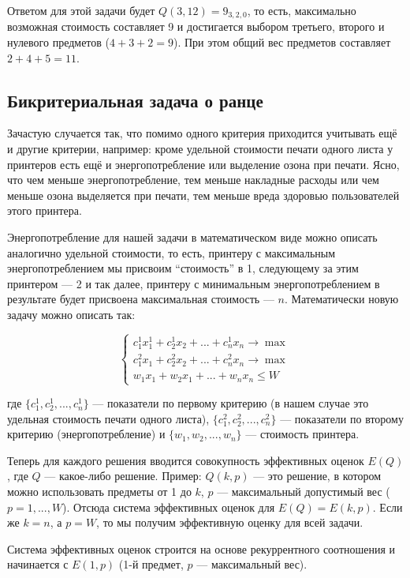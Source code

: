 Ответом для этой задачи будет $Q(3,12) = 9_{3,2,0}$, то есть, максимально возможная стоимость составляет 9 и достигается выбором третьего, второго и нулевого предметов ($4 + 3 + 2 = 9$). При этом общий вес предметов составляет $2 + 4 + 5 = 11$.

\subsection*{Бикритериальная задача о ранце}

Зачастую случается так, что помимо одного критерия приходится учитывать ещё и другие критерии, например: кроме удельной стоимости печати одного листа у принтеров есть ещё и энергопотребление или выделение озона при печати. Ясно, что чем меньше энергопотребление, тем меньше накладные расходы или чем меньше озона выделяется при печати, тем меньше вреда здоровью пользователей этого принтера.

Энергопотребление для нашей задачи в математическом виде можно описать аналогично удельной стоимости, то есть, принтеру с максимальным энергопотреблением мы присвоим ``стоимость'' в 1, следующему за этим принтером --- 2 и так далее, принтеру с минимальным энергопотреблением в результате будет присвоена максимальная стоимость --- $n$. Математически новую задачу можно описать так:

$$
\left\{
\begin{aligned}
c_1^1 x_1^1 + c_2^1 x_2 + ... + c_n^1 x_n \to \max \\
c_1^2 x_1 + c_2^2 x_2 + ... + c_n^2 x_n \to \max \\
w_1 x_1 + w_2 x_1 + ... + w_n x_n \le W
\end{aligned}
\right.
$$

где $\{c_1^1, c_2^1, ..., c_n^1\}$ --- показатели по первому критерию (в нашем случае это удельная стоимость печати одного листа), $\{c_1^2, c_2^2, ..., c_n^2\}$ --- показатели по второму критерию (энергопотребление) и $\{w_1, w_2, ..., w_n\}$ --- стоимость принтера.

Теперь для каждого решения вводится совокупность эффективных оценок $E(Q)$, где $Q$ --- какое-либо решение. Пример: $Q(k, p)$ --- это решение, в котором можно использовать предметы от 1 до $k$, $p$ --- максимальный допустимый вес ($p = 1, ..., W$). Отсюда система эффективных оценок для $E(Q) = E(k, p)$. Если же $k = n$, а $p = W$, то мы получим эффективную оценку для всей задачи.

Система эффективных оценок строится на основе рекуррентного соотношения и начинается с $E(1, p)$ (1-й предмет, $p$ --- максимальный вес).

